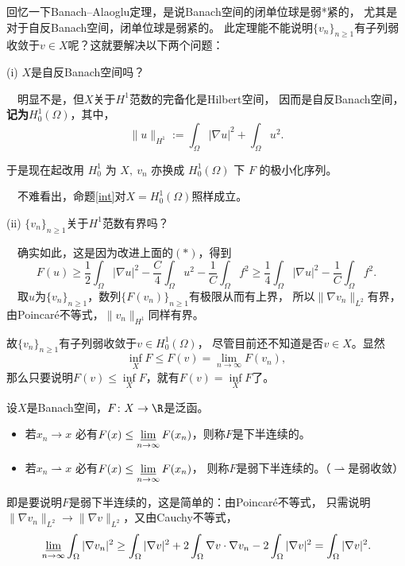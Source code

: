 回忆一下Banach--Alaoglu定理，是说Banach空间的闭单位球是弱*紧的，
尤其是对于自反Banach空间，闭单位球是弱紧的。
此定理能不能说明$\{v_n\}_{n\ge1}$有子列弱收敛于$v\in X$呢？这就要解决以下两个问题：

(i) $X$是自反Banach空间吗？

\quad\ \ 明显不是，但$X$关于$H^1$范数的完备化是Hilbert空间，
因而是自反Banach空间，\textbf{记为$H_0^1(\Omega)$}，其中，
\[\|u\|_{H^1}:=\int_\Omega|\nabla u|^2+\int_\Omega u^2.\]

\begin{center}
    $\boxed{\text{于是现在起改用 }H_0^1\text{ 为 }X,\ 
    v_n\text{ 亦换成 }H_0^1(\Omega)\text{ 下 }F\text{ 的极小化序列。}}$
\end{center}

\quad\ \ 不难看出，命题\ref{int}对$X=H_0^1(\Omega)$照样成立。

(ii) $\{v_n\}_{n\ge1}$关于$H^1$范数有界吗？

\quad\ \ 确实如此，这是因为改进上面的$(*)$，得到
\[F(u)\ge\frac{1}{2}\int_\Omega|\nabla u|^2
-\frac{C}{4}\int_\Omega u^2-\frac{1}{C}\int_\Omega f^2
\ge\frac{1}{4}\int_\Omega|\nabla u|^2-\frac{1}{C}\int_\Omega f^2.\]
\quad\ \ 取$u$为$\{v_n\}_{n\ge1}$，数列$\{F(v_n)\}_{n\ge1}$有极限从而有上界，
所以$\|\nabla v_n\|_{L^2}$有界，由Poincaré不等式，$\|v_n\|_{H^1}$同样有界。

故$\{v_n\}_{n\ge1}$有子列弱收敛于$v\in H_0^1(\Omega)$，
尽管目前还不知道是否$v\in X$。显然
\[\inf_X F\le F(v)=\lim_{n\to\infty} F(v_n),\]
那么只要说明$F(v)\le\inf\limits_X F$，就有$F(v)=\inf\limits_X F$了。

\begin{definition}
    设$X$是Banach空间，$F\colon X\to\R$是泛函。
    \begin{itemize}
        \item 若$x_n\to x$
        必有$F(x)\le\varliminf\limits_{n\to\infty}F(x_n)$，则称$F$是下半连续的。
        \item 若$x_n\rightharpoonup x$
        必有$F(x)\le\varliminf\limits_{n\to\infty}F(x_n)$，
        则称$F$是弱下半连续的。（$\rightharpoonup$是弱收敛）
    \end{itemize}
\end{definition}

即是要说明$F$是弱下半连续的，这是简单的：由Poincaré不等式，
只需说明$\|\nabla v_n\|_{L^2}\to\|\nabla v\|_{L^2}$，又由Cauchy不等式，
\[\varliminf_{n\to\infty}\int_\Omega|\nabla v_n|^2
\ge\int_\Omega|\nabla v|^2+2\int_\Omega\nabla v\cdot\nabla v_n
-2\int_\Omega|\nabla v|^2=\int_\Omega|\nabla v|^2.\]

